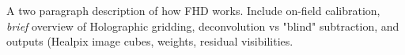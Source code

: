 A two paragraph description of how FHD works. Include on-field calibration, \emph{brief} overview of Holographic gridding, deconvolution vs "blind" subtraction, and outputs (Healpix image cubes, weights, residual visibilities.